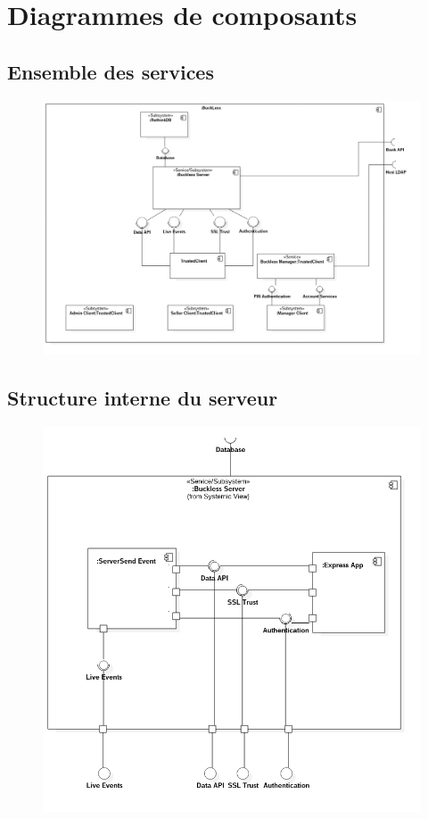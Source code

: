 \section{Diagrammes de composants}
\label{component}
\subsection{Ensemble des services}
    \begin{figure}[h]
        \centering
        \includegraphics[scale=0.45]{./assets/UML/system.png}
        \label{system}
    \end{figure}

\newpage
\subsection{Structure interne du serveur}
    \begin{figure}[h]
        \centering
        \includegraphics[scale=0.55]{./assets/UML/buckless_server.png}
        \label{buckless_server}
    \end{figure}

